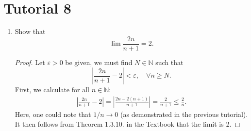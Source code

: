 \documentclass[12pt, reqno]{article}
\numberwithin{equation}{section}
\theoremstyle{definition}
\theoremstyle{remark}
\newcommand{\NN}{\mathbb{N}}
\newcommand{\abs}[1]{\left\lvert#1\right\rvert}
\renewcommand{\epsilon}{\varepsilon}
\begin{document}
\section*{Tutorial 8}

\begin{enumerate}[leftmargin=*]
	\item Show that
	      \[
		      \lim{ \frac{2n}{n+1}} = 2.
	      \]
	      \begin{proof}
		      Let $\epsilon > 0$ be given, we must find $N \in \NN$ such that\[
			      \abs{ \frac{2n}{n+1} - 2 } < \epsilon, \quad \forall n \geq N.
		      \]
		      First, we calculate for all $n \in \NN$:
		      \begin{align*}
			      \abs{ \frac{2n}{n+1} - 2 } = \abs{ \frac{2n - 2(n+1)}{n+1} } = \frac{2}{n+1} \leq \frac{2}{n}.
		      \end{align*}
		      Here, one could note that $1/n \to 0$ (as demonstrated in the previous tutorial). It then follows from Theorem 1.3.10. in the Textbook that the limit is 2.


\end{proof}
\end{enumerate}
\end{document}
